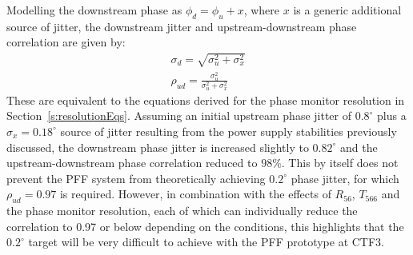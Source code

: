Modelling the downstream phase as \(\phi_d = \phi_u + x\), where \(x\) is a generic additional source of jitter, the downstream jitter and upstream-downstream phase correlation are given by:
\begin{eqnarray}
\sigma_d = \sqrt{\sigma_u^2 + \sigma_x^2} \\
\rho_{ud} = \frac{\sigma_u^2}{\sigma_u^2 + \sigma_x^2}
\end{eqnarray}
These are equivalent to the equations derived for the phase monitor resolution in Section~\ref{s:resolutionEqs}. Assuming an initial upstream phase jitter of \(0.8^\circ\) plus a \(\sigma_x = 0.18^\circ\) source of jitter resulting from the power supply stabilities previously discussed, the downstream phase jitter is increased slightly to \(0.82^\circ\) and the upstream-downstream phase correlation reduced to \(98\%\). This by itself does not prevent the PFF system from theoretically achieving \(0.2^\circ\) phase jitter, for which \(\rho_{ud} = 0.97\) is required. However, in combination with the effects of \(R_{56}\), \(T_{566}\) and the phase monitor resolution, each of which can individually reduce the correlation to 0.97 or below depending on the conditions, this highlights that the \(0.2^\circ\) target will be very difficult to achieve with the PFF prototype at CTF3.
